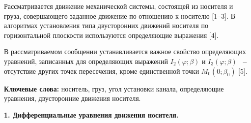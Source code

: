 \vzmscaption



    Рассматривается движение
механической системы,
состоящей из носителя и груза,
совершающего заданное движение
по отношению к носителю
[1{\textbf{--}}3].
В алгоритмах установления типа
двусторонних движений носителя
по горизонтальной плоскости
используются определяющие выражения
[4].



    В рассматриваемом сообщении
устанавливается важное свойство
определяющих уравнений,
записанных для определяющих выражений
$I_{2}\left(\varphi; \beta\right)$
и
$I_{3}\left(\varphi; \beta\right)$%
~{\textbf{--}}
отсутствие других точек пересечения,
кроме единственной точки
$\displaystyle
M_{0}\left(
  0; \beta_{0}
  \right)$
[5].



    \textbf{Ключевые слова:}
носитель,
груз,
угол установки канала,
определяющие уравнения,
двусторонние движения носителя.




\textbf{1. Дифференциальные уравнения
движения носителя.}\nopagebreak


